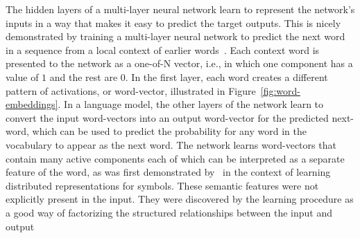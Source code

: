 \documentclass[10pts]{article}
\begin{document}
The hidden layers of a multi-layer neural network learn to represent
the network's inputs in a way that makes it easy to predict the target
outputs. This is nicely demonstrated by training a multi-layer neural
network to predict the next word in a sequence from a local context of
earlier words~\citep{BenDucVin01-short}.  Each context word is
presented to the network as a one-of-N vector, i.e., in which one
component has a value of $1$ and the rest are $0$. 
%
In the first layer, each word
creates a different pattern of activations, or word-vector, illustrated
in Figure~\ref{fig:word-embeddings}.  In a language model, the other
layers of the network learn to convert the input word-vectors into an
output word-vector for the predicted next-word, which can be used to
predict the probability for any word in the vocabulary to appear as
the next word.  The network learns word-vectors that contain many
active components each of which can be interpreted as a separate
feature of the word, as was first demonstrated by~\citet{RHW} in the context
of learning distributed representations for symbols.
These semantic features were not explicitly present
in the input.  They were discovered by the learning procedure as a good way
of factorizing the structured relationships between the input and output
\end{document}
